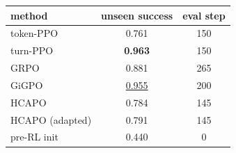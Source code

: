\begin{tabular}{lcc}
\toprule
method & unseen success & eval step \\
\midrule
token-PPO & 0.761 & 150 \\
turn-PPO & \textbf{0.963} & 150 \\
GRPO & 0.881 & 265 \\
GiGPO & \underline{0.955} & 200 \\
HCAPO & 0.784 & 145 \\
HCAPO (adapted) & 0.791 & 145 \\
pre-RL init & 0.440 & 0 \\
\bottomrule
\end{tabular}
